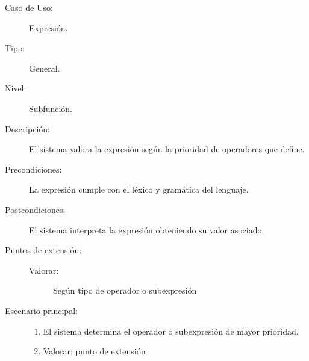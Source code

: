 \begin{framed}
\FloatBarrier
\begin{description}
   \item[Caso de Uso:]  Expresión.
   \item[Tipo:] General.
   \item[Nivel:]  Subfunción.
   \item[Descripción:] 
   El sistema valora la expresión según la prioridad de operadores
   que define. 
   \item[Precondiciones:] 
   La expresión cumple con el léxico y gramática del lenguaje.
   \item[Postcondiciones:] 
   El sistema interpreta la expresión obteniendo su valor asociado.
   \item[Puntos de extensión:] \hfill
      \begin{description}
         \item [Valorar:] Según tipo de operador o subexpresión
      \end{description}
   \item[Escenario principal:] \hfill
   \begin{enumerate}
   \item El sistema determina el operador 
   o subexpresión de mayor prioridad.
   \item Valorar: punto de extensión 
   \end{enumerate}
\end{description}
 \FloatBarrier
\end{framed}


